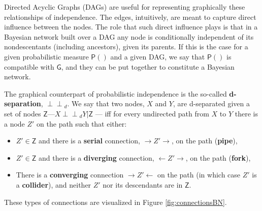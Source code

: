 \documentclass[
  10pt,
  dvipsnames,enabledeprecatedfontcommands]{scrartcl}
\newcommand{\indep}{\!\perp \!\!\! \perp\!}
\newcommand{\pr}[1]{\ensuremath{\mathsf{P}(#1)}}
\begin{document}
Directed Acyclic Graphs (DAGs) are useful for representing graphically
these relationships of independence. The edges, intuitively, are meant
to capture direct influence between the nodes. The role that such direct
influence plays is that in a Bayesian network built over a DAG any node
is conditionally independent of its nondescentants (including
ancestors), given its parents. If this is the case for a given
probabilistic measure \(\pr{}\) and a given DAG, we say that \(\pr{}\)
is compatible with \(\mathsf{G}\), and they can be put together to
constitute a Bayesian network.

The graphical counterpart of probabilistic independence is the so-called
\textbf{d-separation}, \(\indep_d\). We say that two nodes, \(X\) and
\(Y\), are d-separated given a set of nodes
\(\mathsf{Z}\)---\(X\indep_d Y \vert \mathsf{Z}\) --- iff for every
undirected path from \(X\) to \(Y\) there is a node \(Z'\) on the path
such that either:

\begin{itemize}

\item $Z' \in \mathsf{Z}$ and there is a \textbf{serial} connection, $\rightarrow Z' \rightarrow$, on the path (\textbf{pipe}),
\item  $Z'\in \mathsf{Z}$ and there is a \textbf{diverging} connection, $\leftarrow Z' \rightarrow $, on the path (\textbf{fork}),
\item There is a \textbf{converging} connection $\rightarrow Z' \leftarrow$ on the path (in which case $Z'$ is a \textbf{collider}), and neither $Z'$ nor its descendants are in $\mathsf{Z}$.
\end{itemize}

\vspace{1mm}

\noindent These types of connections are visualized in Figure
\ref{fig:connectionsBN}.
\end{document}
